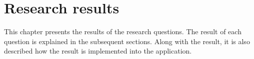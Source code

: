 \chapter{Research results} \label{chapter:results}

This chapter presents the results of the research questions. The result of each question is explained in the subsequent sections. Along with the result, it is also described how the result is implemented into the application. 


\newpage

\newpage
